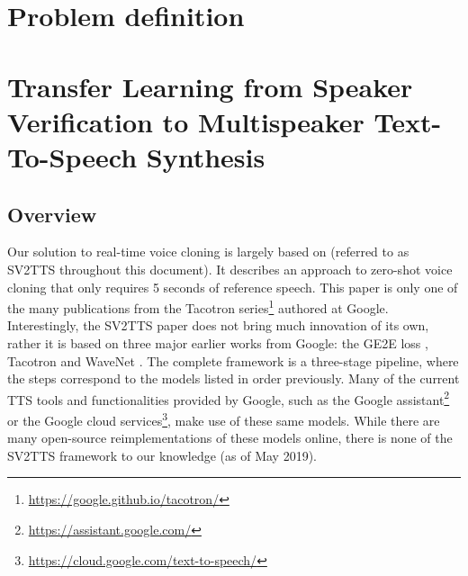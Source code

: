 \documentclass[a4paper, oneside, 12pt, english]{article}
\begin{document}

\section{Problem definition}


\section{Transfer Learning from Speaker Verification to Multispeaker Text-To-Speech Synthesis}
\subsection{Overview}
Our solution to real-time voice cloning is largely based on \citep{SV2TTS} (referred to as SV2TTS throughout this document). It describes an approach to zero-shot voice cloning that only requires 5 seconds of reference speech. This paper is only one of the many publications from the Tacotron series\footnote{\url{https://google.github.io/tacotron/}} authored at Google. Interestingly, the SV2TTS paper does not bring much innovation of its own, rather it is based on three major earlier works from Google: the GE2E loss \citep{GE2E}, Tacotron \citep{Tacotron1} and WaveNet \citep{WaveNet}. The complete framework is a three-stage pipeline, where the steps correspond to the models listed in order previously. Many of the current TTS tools and functionalities provided by Google, such as the Google assistant\footnote{\url{https://assistant.google.com/}} or the Google cloud services\footnote{\url{https://cloud.google.com/text-to-speech/}}, make use of these same models. While there are many open-source reimplementations of these models online, there is none of the SV2TTS framework to our knowledge (as of May 2019).
\end{document}

